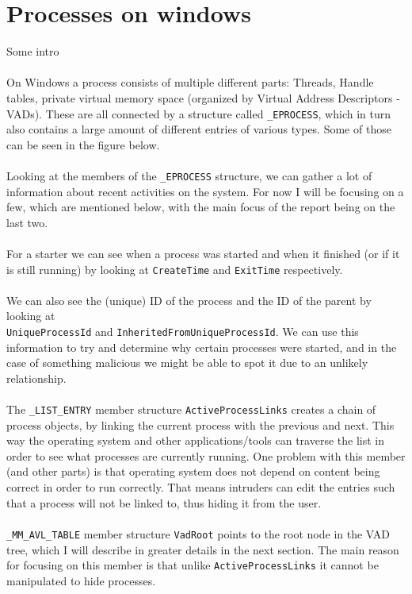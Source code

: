 \documentclass[a4paper]{article}
\begin{document}
\section{Processes on windows}
%
Some intro \\ \\
%
On Windows a process consists of multiple different parts: Threads, Handle tables, private virtual memory space (organized by Virtual Address Descriptors - VADs). These are all connected by a structure called \texttt{\_EPROCESS}, which in turn also contains a large amount of different entries of various types. Some of those can be seen in the figure below. \\ \\
Looking at the members of the \texttt{\_EPROCESS} structure, we can gather a lot of information about recent activities on the system. For now I will be focusing on a few, which are mentioned below, with the main focus of the report being on the last two. \\ \\
%
For a starter we can see when a process was started and when it finished (or if it is still running) by looking at \texttt{CreateTime} and \texttt{ExitTime} respectively. \\ \\
%
We can also see the (unique) ID of the process and the ID of the parent by looking at \\ \texttt{UniqueProcessId} and \texttt{InheritedFromUniqueProcessId}. We can use this information to try and determine why certain processes were started, and in the case of something malicious we might be able to spot it due to an unlikely relationship. \\\\
%
The \texttt{\_LIST\_ENTRY} member structure \texttt{ActiveProcessLinks} creates a chain of process objects, by linking the current process with the previous and next. This way the operating system and other applications/tools can traverse the list in order to see what processes are currently running.  
One problem with this member (and other parts) is that operating system does not depend on content being correct in order to run correctly. That means intruders can edit the entries such that a process will not be linked to, thus hiding it from the user. \\\\
%
\texttt{\_MM\_AVL\_TABLE} member structure \texttt{VadRoot} points to the root node in the VAD tree, which I will describe in greater details in the next section. The main reason for focusing on this member is that unlike \texttt{ActiveProcessLinks} it cannot be manipulated to hide processes. \\
\end{document}
